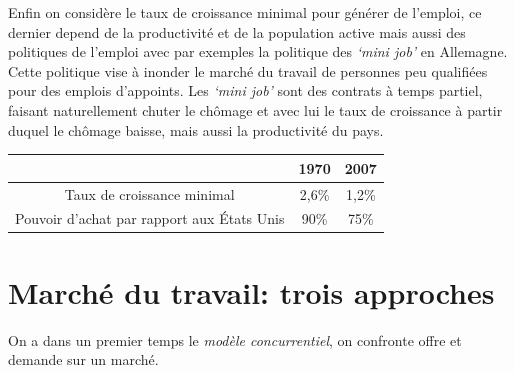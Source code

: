 \documentclass[main.tex]{subfiles}
\begin{document}
Enfin on considère le taux de croissance minimal pour générer de l'emploi, ce dernier depend de la productivité et de la population active mais aussi des politiques de l'emploi avec par exemples la politique des \emph{`mini job'} en Allemagne. Cette politique vise à inonder le marché du travail de personnes peu qualifiées pour des emplois d'appoints. Les \emph{`mini job'} sont des contrats à temps partiel, faisant naturellement chuter le chômage et avec lui le taux de croissance à partir duquel le chômage baisse, mais aussi la productivité du pays.
\medskip

\begin{center}
        \begin{tabular}{|*{3}{c|}}
               \hline
               & 1970 & 2007 \\
               \hline
               Taux de croissance minimal & 2,6\% & 1,2\% \\
               \hline
               Pouvoir d'achat par rapport aux États Unis & 90\% & 75\% \\
               \hline
        \end{tabular}
\end{center}

\section{Marché du travail: trois approches}

        On a dans un premier temps le \emph{modèle concurrentiel}, on confronte offre et demande sur un marché. \\
\end{document}
